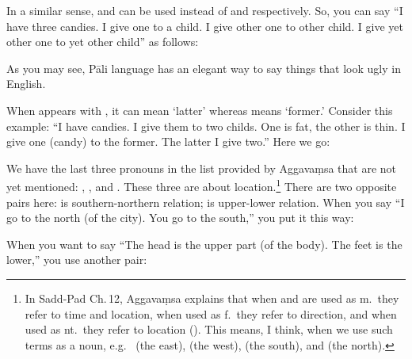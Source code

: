 
In a similar sense,  and  can be used instead of  and  respectively. So, you can say ``I have three candies. I give one to a child. I give other one to other child. I give yet other one to yet other child'' as follows:


As you may see, P\=ali language has an elegant way to say things that look ugly in English.

When  appears with , it can mean `latter' whereas  means `former.' Consider this example: ``I have candies. I give them to two childs. One is fat, the other is thin. I give one (candy) to the former. The latter I give two.'' Here we go:


We have the last three pronouns in the list provided by Aggava\d msa that are not yet mentioned: , , and . These three are about location.\footnote{In Sadd-Pad Ch.\,12, Aggava\d msa explains that when  and  are used as m.\ they refer to time and location, when used as f.\ they refer to direction, and when used as nt.\ they refer to location (). This means, I think, when we use such terms as a noun, e.g.\  (the east),  (the west),  (the south), and  (the north).} There are two opposite pairs here:  is southern-northern relation;  is upper-lower relation. When you say ``I go to the north (of the city). You go to the south,'' you put it this way:


When you want to say ``The head is the upper part (of the body). The feet is the lower,'' you use another pair:

